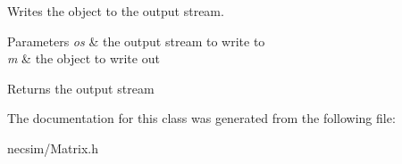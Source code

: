 Writes the object to the output stream. 


\begin{DoxyParams}{Parameters}
{\em os} & the output stream to write to \\
\hline
{\em m} & the object to write out \\
\hline
\end{DoxyParams}
\begin{DoxyReturn}{Returns}
the output stream 
\end{DoxyReturn}


The documentation for this class was generated from the following file\+:\begin{DoxyCompactItemize}
\item 
necsim/Matrix.\+h\end{DoxyCompactItemize}
